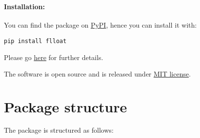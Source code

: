 \paragraph{Installation:} You can find the package on \href{https://pypi.org/project/flloat/}{PyPI}, hence you can install it with:
\begin{lstlisting}[language=bash]
pip install flloat
\end{lstlisting}
Please go \href{https://github.com/MarcoFavorito/flloat#install}{here} for further details.

The software is open source and is released under \href{https://github.com/MarcoFavorito/flloat/blob/master/LICENSE}{MIT license}.

\section{Package structure}
The package is structured as follows:
